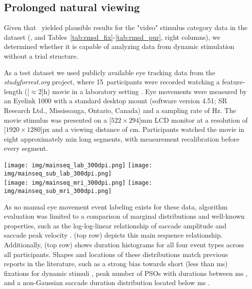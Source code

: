 \subsection*{Prolonged natural viewing}\label{ana_2}

Given that \remodnav\ yielded plausible results for the "video" stimulus
category data in the \citet{Andersson2017} dataset (, and
Tables~\ref{tab:rmsd_fix}-\ref{tab:rmsd_pur}, right columns), we determined
whether it is capable of analyzing data from dynamic stimulation without a
trial structure.

As a test dataset we used publicly available eye tracking data from the
\textit{studyforrest.org} project, where 15~participants were recorded watching
a feature-length (\unit[$\approx$2]{h}) movie in a laboratory setting
\citep{Hanke2016}. Eye movements were measured by an Eyelink 1000 with a
standard desktop mount (software version 4.51; SR Research Ltd., Mississauga,
Ontario, Canada) and a sampling rate of \unit[1000]{Hz}. The movie stimulus was
presented on a \unit[$522\times294$]{mm} LCD monitor at a resolution of
\unit[$1920\times1280$]{px} and a viewing distance of \unit[85]{cm}. Participants
watched the movie in eight approximately \unit[15]{min} long segments,
with measurement recalibration before every segment.

\begin{figure*}[tbp]
  \texttt{[image: img/mainseq\_lab\_300dpi.png]}
  \texttt{[image: img/mainseq\_sub\_lab\_300dpi.png]} \\
  \texttt{[image: img/mainseq\_mri\_300dpi.png]}
  \texttt{[image: img/mainseq\_sub\_mri\_300dpi.png]}

  \caption{Main sequence of eye movement events during one 15 minute sequence of
  the movie (segment 2) for lab (top), and MRI participants (bottom). Data
  across all participants per dataset is shown on the left, and data for a single
  exemplary participant on the right.}

  \label{fig:overallComp}
\end{figure*}

As no manual eye movement event labeling exists for these data, algorithm
evaluation was limited to a comparison of marginal distributions and well-known
properties, such as the log-log-linear relationship of saccade amplitude and
saccade peak velocity \citep{bahill1975main}.  (top row)
depicts this main sequence relationship.
%
Additionally,  (top row) shows duration histograms for all four event
types across all participants. Shapes and locations of these distributions
match previous reports in the literature, such as a strong bias towards short
(less than \unit[500]{ms}) fixations for dynamic stimuli
\citep[Fig.~3]{dorr2010variability}, peak number of PSOs with durations between
\unit[10-20]{ms} \citep[Fig.~11]{Nystrom2010AnData}, and a non-Gaussian saccade
duration distribution located below \unit[100]{ms} \citep[Fig.~8, albeit for
static scene perception]{Nystrom2010AnData}.

